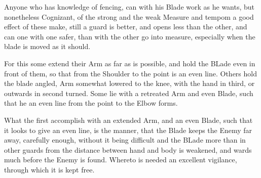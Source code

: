 \newpage


\newpage



Anyone who has knowledge of fencing,
can with his Blade work as he wants, but nonetheless Cognizant, of the
strong and the weak Measure and tempom a good effect of these make,
still a guard is better, and opens less than the other, and can one
with one safer, than with the other go into measure, especially when
the blade is moved as it should.

For this some extend their Arm as far as is possible, and hold the
BLade even in front of them, so that from the Shoulder to the point is
an even line. Others hold the blade angled, Arm somewhat lowered to
the knee, with the hand in third, or outwards in second turned. Some
lie with a retreated Arm and even Blade, such that he an even line
from the point to the Elbow forms.

What the first accomplish with an extended Arm, and an even Blade,
such that it looks to give an even line, is the manner, that the Blade
keeps the Enemy far away, carefully enough, without it being difficult
and the BLade more than in other guards from the distance between hand
and body is weakened, and wards much before the Enemy is
found. Whereto is needed an excellent vigilance, through which it is
kept free.

